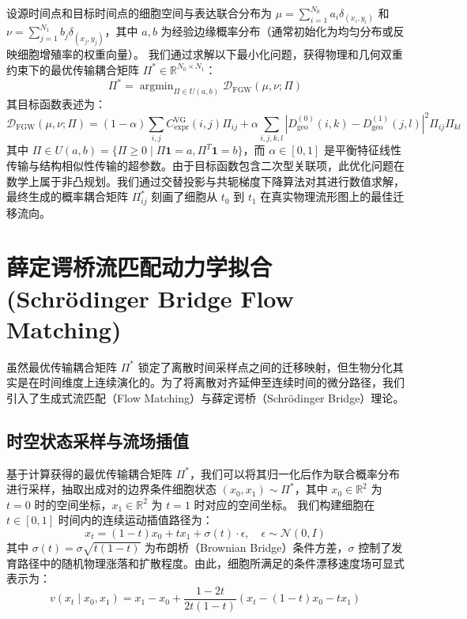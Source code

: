 设源时间点和目标时间点的细胞空间与表达联合分布为 $\mu = \sum_{i=1}^{N_0} a_i \delta_{(x_i, y_i)}$ 和 $\nu = \sum_{j=1}^{N_1} b_j \delta_{(x_j, y_j)}$，其中 $a, b$ 为经验边缘概率分布（通常初始化为均匀分布或反映细胞增殖率的权重向量）。
我们通过求解以下最小化问题，获得物理和几何双重约束下的最优传输耦合矩阵 $\Pi^* \in \mathbb{R}^{N_0 \times N_1}$：
\begin{equation}
    \Pi^* = \operatorname{argmin}_{\Pi \in U(a, b)} \mathcal{D}_{\text{FGW}}(\mu, \nu; \Pi)
\end{equation}
其目标函数表述为：
\begin{equation}
    \mathcal{D}_{\text{FGW}}(\mu, \nu; \Pi) = (1 - \alpha) \sum_{i,j} C_{\text{expr}}^{\text{VG}}(i, j) \Pi_{ij} + \alpha \sum_{i,j,k,l} \left| D_{\text{geo}}^{(0)}(i, k) - D_{\text{geo}}^{(1)}(j, l) \right|^2 \Pi_{ij} \Pi_{kl}
\end{equation}
其中 $\Pi \in U(a, b) = \{ \Pi \ge 0 \mid \Pi \mathbf{1} = a, \Pi^T \mathbf{1} = b \}$，而 $\alpha \in [0, 1]$ 是平衡特征线性传输与结构相似性传输的超参数。由于目标函数包含二次型关联项，此优化问题在数学上属于非凸规划。我们通过交替投影与共轭梯度下降算法对其进行数值求解，最终生成的概率耦合矩阵 $\Pi^*_{ij}$ 刻画了细胞从 $t_0$ 到 $t_1$ 在真实物理流形图上的最佳迁移流向。

\section{薛定谔桥流匹配动力学拟合 (Schrödinger Bridge Flow Matching)}
虽然最优传输耦合矩阵 $\Pi^*$ 锁定了离散时间采样点之间的迁移映射，但生物分化其实是在时间维度上连续演化的。为了将离散对齐延伸至连续时间的微分路径，我们引入了生成式流匹配（Flow Matching）与薛定谔桥（Schrödinger Bridge）理论\cite{Lipman2023, Schrodinger1931}。

\subsection{时空状态采样与流场插值}
基于计算获得的最优传输耦合矩阵 $\Pi^*$，我们可以将其归一化后作为联合概率分布进行采样，抽取出成对的边界条件细胞状态 $(x_0, x_1) \sim \Pi^*$，其中 $x_0 \in \mathbb{R}^2$ 为 $t=0$ 时的空间坐标，$x_1 \in \mathbb{R}^2$ 为 $t=1$ 时对应的空间坐标。
我们构建细胞在 $t \in [0, 1]$ 时间内的连续运动插值路径为：
\begin{equation}
    x_t = (1 - t) x_0 + t x_1 + \sigma(t) \cdot \epsilon, \quad \epsilon \sim \mathcal{N}(0, I)
\end{equation}
其中 $\sigma(t) = \sigma \sqrt{t(1 - t)}$ 为布朗桥（Brownian Bridge）条件方差，$\sigma$ 控制了发育路径中的随机物理涨落和扩散程度。由此，细胞所满足的条件漂移速度场可显式表示为：
\begin{equation}
    v(x_t \mid x_0, x_1) = x_1 - x_0 + \frac{1 - 2t}{2t(1 - t)} \left( x_t - (1 - t) x_0 - t x_1 \right)
\end{equation}

